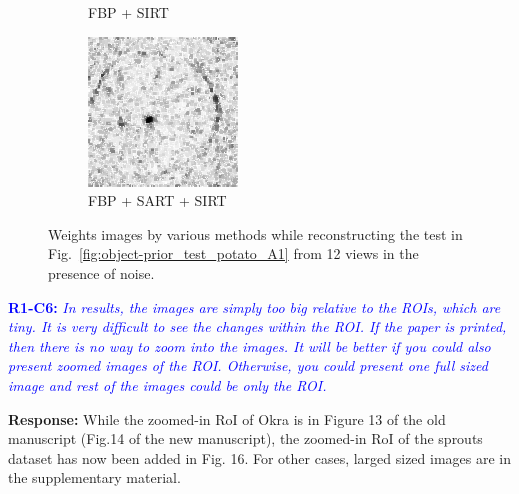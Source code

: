 \documentclass{article}
\begin{document}
\begin{figure}[!h]
\begin{subfigure}[b]{0.2\linewidth}
\captionsetup{labelformat=empty}
        \caption{FBP + SIRT}
    \end{subfigure}
    \quad
        \begin{subfigure}[b]{0.2\linewidth}
        \includegraphics[width=\textwidth]{../images/potato/artefacts/with_noise/weightsIm_fbp_sart_sirt30.png}
\captionsetup{labelformat=empty}
        \caption{FBP + SART + SIRT}
     \end{subfigure}
      \caption{Weights images by various methods while reconstructing the test in Fig.~\ref{fig:object-prior_test_potato_A1} from 12 views in the presence of noise.}
\label{fig:weights_with_noise}
\end{figure}

\textcolor{blue}{\textbf{R1-C6:}\textit{ In results, the images are simply too big relative to the ROIs, which are tiny. It is very difficult to see the changes within the ROI. If the paper is printed, then there is no way to zoom into the images. It will be better if you could also present zoomed images of the ROI. Otherwise, you could present one full sized image and rest of the images could be only the ROI. }}

\textbf{Response:} While the zoomed-in RoI of Okra is in Figure 13 of the old manuscript (Fig.14 of the new manuscript), the zoomed-in RoI of the sprouts dataset has now been added in Fig. 16.  For other cases, larged sized images are in the supplementary material.\\
\end{document}
